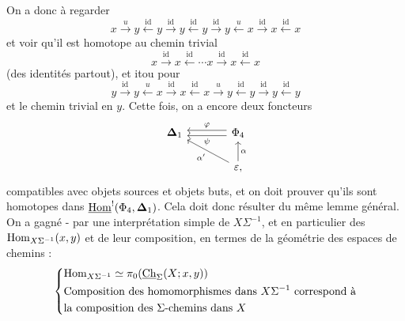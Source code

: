 On a donc à regarder
\[
x \xrightarrow{u} y \xleftarrow{\mathrm{id}} y \xrightarrow{\mathrm{id}} y \xleftarrow{\mathrm{id}} y \xrightarrow{\mathrm{id}} y \xleftarrow{u} x \xrightarrow{\mathrm{id}} x \xleftarrow{\mathrm{id}} x
\]
et voir qu'il est homotope au chemin trivial
\[
x \xrightarrow{\mathrm{id}} x \xleftarrow{\mathrm{id}} \cdots x \xrightarrow{\mathrm{id}} x \xleftarrow{\mathrm{id}} x
\]
(des identités partout), et itou pour
\[
y \xrightarrow{\mathrm{id}} y \xleftarrow{u} x \xrightarrow{\mathrm{id}} x \xleftarrow{\mathrm{id}} x \xrightarrow{u} y \xleftarrow{\mathrm{id}} y \xrightarrow{\mathrm{id}} y \xleftarrow{\mathrm{id}} y
\]
et le chemin trivial en $y$. Cette fois, on a encore deux foncteurs
\[
\begin{tikzcd}[column sep=large]
\bDelta_1 & \Phi_4 \arrow[l, shift right, "\varphi"'] \arrow[l, shift left, "\psi"] \\
& \varepsilon, \arrow[ul, "\alpha'"] \arrow[u, "\alpha"']
\end{tikzcd}
\]
compatibles avec objets sources et objets buts, et on doit prouver qu'ils sont homotopes dans $\underline{\mathrm{Hom}}^!(\Phi_4, \boldsymbol{\Delta}_1)$. Cela doit donc résulter du même lemme général. On a gagné - par une interprétation simple de $X\Sigma^{-1}$, et en particulier des $\mathrm{Hom}_{X\Sigma^{-1}}(x,y)$ et de leur composition, en termes de la géométrie des espaces de chemins :
\[
\left\{
\begin{aligned}
&\Hom_{X\Sigma^{-1}} \simeq \pi_0(\uCh_\Sigma(X;x,y)) \\ %
&\text{Composition des homomorphismes dans } X\Sigma^{-1} \text{ correspond à} \\
&\text{la composition des } \Sigma\text{-chemins dans } X
\end{aligned}
\right.
\]

